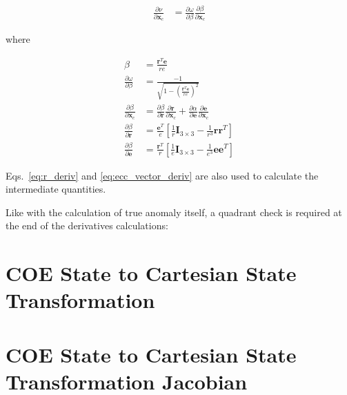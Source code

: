 \documentclass[]{article}
\newcommand{\vb}[1]{\bm{#1}} %
\newcommand{\pd}[2]{\frac{\partial #1}{\partial #2}} %
\newcommand{\xc}[0]{\vb{x}_c}
\begin{document}
\begin{align}
\label{eq:ta_deriv}
\pd{\nu}{\xc} &= \pd{\omega}{\beta} \pd{\beta}{\xc}
\end{align}

\noindent where

\begin{align}
\beta &= \frac{\vb{r}^T \vb{e}}{re} \\
\pd{\omega}{\beta} &= \frac{-1}{\sqrt{1 - \left( \frac{\vb{r}^T \vb{e}}{r e} \right)^2}} \\
\pd{\beta}{\xc} &= \pd{\beta}{\vb{r}} \pd{\vb{r}}{\xc} + \pd{\alpha}{\vb{e}} \pd{\vb{e}}{\xc} \\
\pd{\beta}{\vb{r}} &= \frac{\vb{e}^T}{e} \left[ \frac{1}{r} \vb{I}_{3 \times 3} - \frac{1}{r^3} \vb{r} \vb{r}^T \right] \\
\pd{\beta}{\vb{e}} &= \frac{\vb{r}^T}{r} \left[ \frac{1}{e} \vb{I}_{3 \times 3} - \frac{1}{e^3} \vb{e} \vb{e}^T \right]
\end{align}

\noindent Eqs.~\eqref{eq:r_deriv} and \eqref{eq:ecc_vector_deriv} are also used to calculate the intermediate quantities.

Like with the calculation of true anomaly itself, a quadrant check is required at the end of the derivatives calculations:


\section{COE State to Cartesian State Transformation}
\label{sec:coe2cartesian}


\section{COE State to Cartesian State Transformation Jacobian}
\label{sec:coe2cartesianjac}
\end{document}
